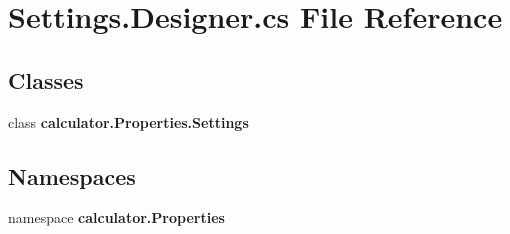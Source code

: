 \section{Settings.\+Designer.\+cs File Reference}
\label{_settings_8_designer_8cs}
\subsection*{Classes}
\begin{DoxyCompactItemize}
\item 
class {\bfseries calculator.\+Properties.\+Settings}
\end{DoxyCompactItemize}
\subsection*{Namespaces}
\begin{DoxyCompactItemize}
\item 
namespace \textbf{ calculator.\+Properties}
\end{DoxyCompactItemize}
